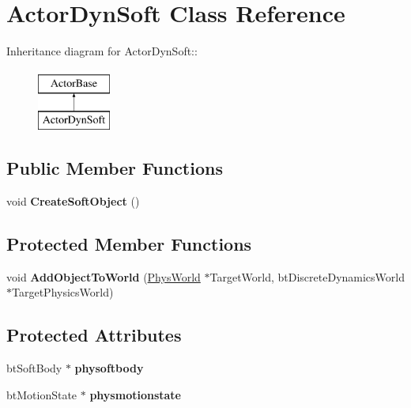 \hypertarget{classActorDynSoft}{
\section{ActorDynSoft Class Reference}
\label{dc/de0/classActorDynSoft}
}
Inheritance diagram for ActorDynSoft::\begin{figure}[H]
\begin{center}
\leavevmode
\includegraphics[height=2cm]{dc/de0/classActorDynSoft}
\end{center}
\end{figure}
\subsection*{Public Member Functions}
\begin{DoxyCompactItemize}
\item 
\hypertarget{classActorDynSoft_a249bc0621b1d55ea0a9c7787605078d6}{
void {\bfseries CreateSoftObject} ()}
\label{dc/de0/classActorDynSoft_a249bc0621b1d55ea0a9c7787605078d6}

\end{DoxyCompactItemize}
\subsection*{Protected Member Functions}
\begin{DoxyCompactItemize}
\item 
\hypertarget{classActorDynSoft_a6bd52511d954edfe09c26594535dd2f1}{
void {\bfseries AddObjectToWorld} (\hyperlink{classPhysWorld}{PhysWorld} $\ast$TargetWorld, btDiscreteDynamicsWorld $\ast$TargetPhysicsWorld)}
\label{dc/de0/classActorDynSoft_a6bd52511d954edfe09c26594535dd2f1}

\end{DoxyCompactItemize}
\subsection*{Protected Attributes}
\begin{DoxyCompactItemize}
\item 
\hypertarget{classActorDynSoft_a9f5b3e1cfa400bb6095f77feb81e76d8}{
btSoftBody $\ast$ {\bfseries physoftbody}}
\label{dc/de0/classActorDynSoft_a9f5b3e1cfa400bb6095f77feb81e76d8}

\item 
\hypertarget{classActorDynSoft_aad9dfc6f0d3f08c8abd110c8c9175b97}{
btMotionState $\ast$ {\bfseries physmotionstate}}
\label{dc/de0/classActorDynSoft_aad9dfc6f0d3f08c8abd110c8c9175b97}

\end{DoxyCompactItemize}


